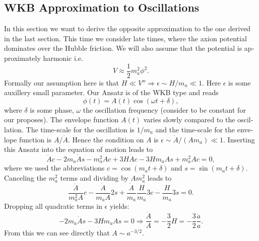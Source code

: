 \documentclass[master,       %
               twoside,        %
               BCOR10mm,       %
               english,ngerman, %
               ]{GAUBM}
\begin{document}
\begin{otherlanguage}{english}
\subsection{WKB Approximation to Oscillations}
\label{sec:wkb_approximation}

In this section we want to derive the opposite approximation to the one derived in the last section.
This time we consider late times, where the axion potential dominates over the Hubble friction.
We will also assume that the potential is approximately harmonic i.e.
\begin{equation}
	V \approx \frac{1}{2} m_a^2 \phi^2.
\end{equation}
Formally our assumption here is that $H \ll V'' \Rightarrow \epsilon \sim H / m_a \ll 1$. Here $\epsilon$ is some auxillery small parameter.
Our Ansatz is of the WKB type and reads
\begin{equation}
	\phi(t) = A(t) \cos(\omega t + \delta),
\end{equation}
where $\delta$ is some phase, $\omega$ the oscillation frequency (consider to be constant for our proposes). The envelope function $A(t)$ varies slowly compared to the oscillation. The time-scale for the oscillation is $1/m_a$ and the time-scale for the envelope function is $A / \dot{A}$. Hence the condition on $A$ is $\epsilon \sim \dot{A} / (A m_a) \ll 1$.
Inserting this Ansatz into the equation of motion leads to
\begin{equation}
	\ddot{A} c - 2 m_a \dot{A} s - m_a^2 A c + 3 H \dot{A} c - 3 H m_a A s + m_a^2 A c = 0,
\end{equation}
where we used the abbreviations $c = \cos(m_a t + \delta)$ and $s = \sin(m_a t + \delta)$.
Canceling the $m_a^2$ terms and dividing by $A m_a^2$ leads to
\begin{equation}
	\frac{\ddot{A}}{m_a^2 A} c - \frac{\dot{A}}{m_a A} 2 s + \frac{\dot{A}}{m_a} \frac{H}{m_a} 3 c - \frac{H}{m_a} 3 s = 0.
\end{equation}
Dropping all quadratic terms in $\epsilon$ yields:
\begin{equation}
	 - 2 m_a \dot{A} s - 3 H m_a A s = 0 \Rightarrow \frac{\dot{A}}{A} = - \frac{3}{2} H = - \frac{3}{2} \frac{\dot{a}}{a}.
\end{equation}
From this we can see directly that $A \sim a^{-3/2}$.


\end{otherlanguage}
\end{document}
